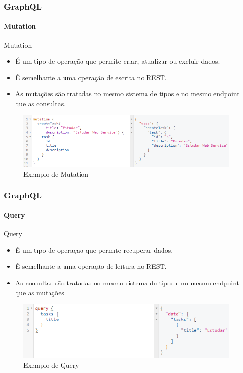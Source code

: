 \documentclass[
	9pt, %
	t, %
]{beamer}
\newcommand{\yellowbox}[1]{\colorbox{yellow!75}{#1}}
\begin{document}
\begin{frame}
	\frametitle{GraphQL}
	\framesubtitle{Mutation}

	\begin{block}{Mutation}
		\begin{itemize}
			\item É um tipo de operação que permite \yellowbox{criar, atualizar ou excluir dados.}
			\item É semelhante a uma operação de escrita no REST.
			\item As mutações são tratadas no mesmo sistema de tipos e no mesmo endpoint que as consultas.
		\end{itemize}
	\end{block}

	\begin{figure}
		\includegraphics[width=0.9\linewidth]{gql_mutation.png}
		\caption{Exemplo de Mutation}
		\label{fig:graphql_mutation}
	\end{figure}

\end{frame}

\begin{frame}
	\frametitle{GraphQL}
	\framesubtitle{Query}

	\begin{block}{Query}
		\begin{itemize}
			\item É um tipo de operação que permite \yellowbox{recuperar dados.}
			\item É semelhante a uma operação de leitura no REST.
			\item As consultas são tratadas no mesmo sistema de tipos e no mesmo endpoint que as mutações.
		\end{itemize}
	\end{block}

	\begin{figure}
		\includegraphics[width=0.9\linewidth]{gql_query.png}
		\caption{Exemplo de Query}
		\label{fig:graphql_query}
	\end{figure}

\end{frame}
\end{document}
